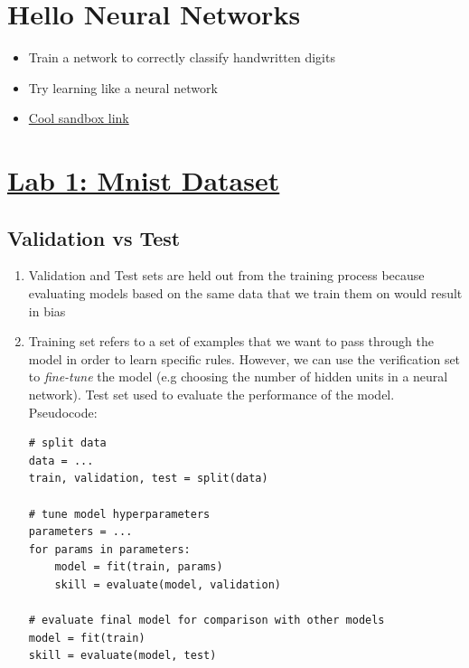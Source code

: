 \documentclass{article}
\begin{document}
\section{Hello Neural Networks}
\begin{itemize}
    \item Train a network to correctly classify handwritten digits
    \item Try learning like a neural network
    \item \href{https://build.nvidia.com/}{Cool sandbox link}
\end{itemize}

\section{\href{http://dli-e5d62e622240-a8611b.westus3.cloudapp.azure.com/lab/lab/tree/01_mnist.ipynb}{Lab 1: Mnist Dataset}}
\subsection{Validation vs Test}
\begin{enumerate}
    \item Validation and Test sets are held out from the training process because evaluating models based on the same data that we train them on would result in bias
    \item Training set refers to a set of examples that we want to pass through the model in order to learn specific rules. However, we can use the verification set to \textit{fine-tune} the model (e.g choosing the number of hidden units in a neural network). Test set used to evaluate the performance of the model. Pseudocode: 
    \begin{verbatim}
# split data
data = ...
train, validation, test = split(data)

# tune model hyperparameters
parameters = ...
for params in parameters:
	model = fit(train, params)
	skill = evaluate(model, validation)

# evaluate final model for comparison with other models
model = fit(train)
skill = evaluate(model, test)
    \end{verbatim}
\end{enumerate}
\end{document}
